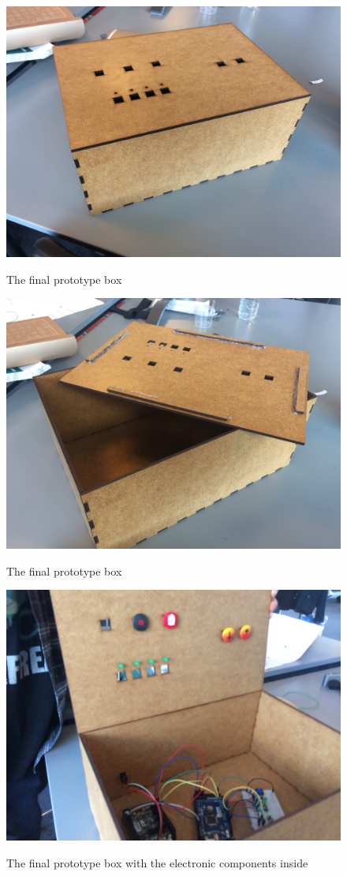 \begin{figure}[H]
	\centering
	\includegraphics[width=0.7\linewidth]{figure/Design/finalbox1}
	\label{fig:finalbox1}
	\caption{The final prototype box}
	
\end{figure}

\begin{figure}[H]
	\centering
	\includegraphics[width=0.7\linewidth]{figure/Design/finalbox2}
	\label{fig:finalbox2}
	\caption{The final prototype box}
	
\end{figure}

\begin{figure}[H]
	\centering
	\includegraphics[width=0.7\linewidth]{figure/Design/finalbox3}
	\label{fig:finalbox3}
	\caption{The final prototype box with the electronic components inside}
	
\end{figure}






